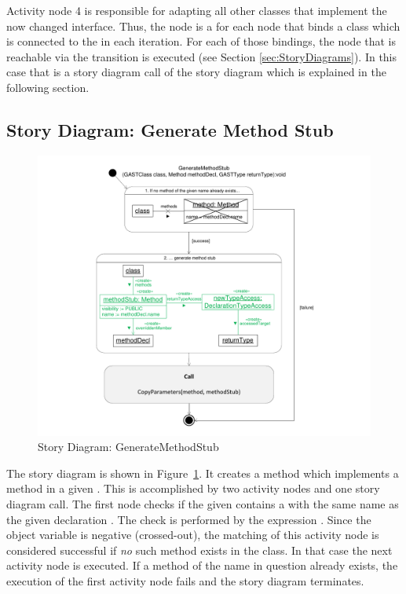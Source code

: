 Activity node 4 is responsible for adapting all other classes that implement the now changed interface. Thus, the node is a for each node that binds a class which is connected to the  in each iteration. For each of those bindings, the node that is reachable via the  transition is executed (see Section \ref{sec:StoryDiagrams}). In this case that is a story diagram call of the story diagram  which is explained in the following section.

\subsection{Story Diagram: Generate Method Stub}

\begin{figure}[hbtp]
\centering
\includegraphics[width=0.9\linewidth]{./figures/SDGenerateMethodStub}
\caption{Story Diagram: GenerateMethodStub}
\label{fig:SDGenerateMethodStub}
\end{figure}

The story diagram  is shown in Figure~\ref{fig:SDGenerateMethodStub}. It creates a method which implements a method  in a given . This is accomplished by two activity nodes and one story diagram call. The first node checks if the given  contains a  with the same name as the given declaration . The check is performed by the expression . Since the object variable  is negative (crossed-out), the matching of this activity node is considered successful if \emph{no} such method exists in the class. In that case the next activity node is executed. If a method of the name in question already exists, the execution of the first activity node fails and the story diagram terminates.

